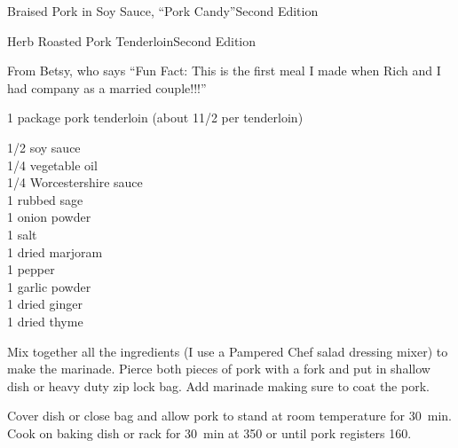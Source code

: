 \begin{entry}{Braised Pork in Soy Sauce, ``Pork Candy''}{Second Edition}
\end{entry}

\begin{entry}{Herb Roasted Pork Tenderloin}{Second Edition}

\begin{open}
  From Betsy, who says ``Fun Fact:  This is the first meal I made when Rich and I had company as a married couple!!!''
\end{open}
\begin{ingredients}
  1 package pork tenderloin (about 1\SI{1/2}{\pound} per tenderloin)
\end{ingredients}
\begin{ingredients}
  \SI{1/2}{\cup} soy sauce\\
  \SI{1/4}{\cup} vegetable oil\\
  \SI{1/4}{\cup} Worcestershire sauce\\
  \SI{1}{\teaspoon} rubbed sage\\
  \SI{1}{\teaspoon} onion powder\\
  \SI{1}{\teaspoon} salt\\
  \SI{1}{\teaspoon} dried marjoram\\
  \SI{1}{\teaspoon} pepper\\
  \SI{1}{\teaspoon} garlic powder\\
  \SI{1}{\teaspoon} dried ginger\\
  \SI{1}{\teaspoon} dried thyme
\end{ingredients}
Mix together all the ingredients (I use a Pampered Chef salad dressing mixer) to
make the marinade. Pierce both pieces of pork with a fork and put in shallow
dish or heavy duty zip lock bag. Add marinade making sure to coat the pork.

Cover dish or close bag and allow pork to stand at room temperature for
\SI{30}{\minute}. Cook on baking dish or rack for \SI{30}{\minute} at
\SI{350}{\degreeF} or until pork registers \SI{160}{\degreeF}.

\end{entry}


